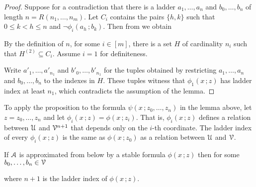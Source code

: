 \documentclass[scombinatorics.tex]{subfiles}
\begin{document}
\begin{proof} 
  Suppose for a contradiction that there is a ladder $a_1,\dots,a_n$ and $b_0,\dots,b_n$ of length $n=R(n_1,\dots, n_m)$.
  Let $C_i$ contains the pairs $\{h,k\}$ such that $0\le k<h\le n$ and $\neg\phi_i(a_h\,;b_k)$.
  Then from  we obtain 
  
  
  By the definition of $n$, for some $i\in[m]$, there is a set $H$ of cardinality $n_i$ such that $H^{(2)}\subseteq C_i$.
  Assume $i{=}1$ for definiteness.

  Write $a'_1,\dots,a'_{n_1}$ and $b'_0,\dots,b'_{n_1}$ for the tuples obtained by restricting $a_1,\dots,a_n$ and $b_0,\dots,b_n$ to the indexes in $H$.
  These tuples witness that $\phi_1(x\,;z)$ has ladder index at least $n_1$, which contradicts the assumption of the lemma.
\end{proof}

To apply the proposition to the formula $\psi(x\,;z_0,\dots,z_n)$ in the lemma above, let $z=z_0,\dots,z_n$ and let $\phi_i(x\,;z)=\phi(x\,;z_i)$.
That is, $\phi_i(x\,;z)$ defines a relation between $\EuScript U$ and $\EuScript V^{n+1}$ that depends only on the $i$-th coordinate.
The ladder index of every $\phi_i(x\,;z)$ is the same as $\phi(x\,;z_0)$ as a relation between $\EuScript U$ and $\EuScript V$.


\begin{lemma}
  If $\EuScript A$ is approximated from below by a stable formula $\phi(x\,;z)$ then for some $b_0,\dots,b_n\in\EuScript V$ 
  \\[-1ex]
  
  where $n+1$ is the ladder index of $\phi(x\,;z)$. 
\end{lemma}
  
\end{document}
